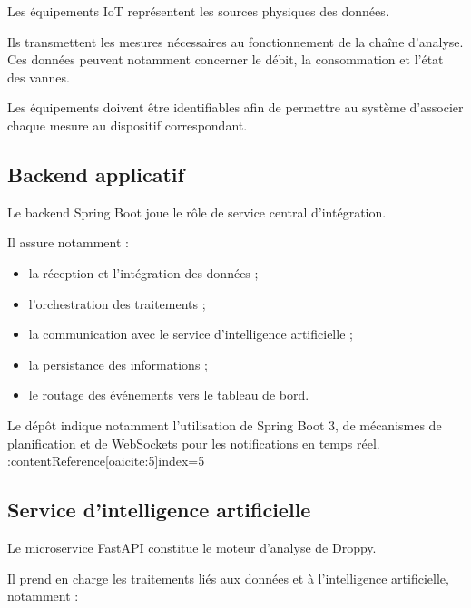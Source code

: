 Les équipements IoT représentent les sources physiques des données.

Ils transmettent les mesures nécessaires au fonctionnement de la chaîne
d'analyse. Ces données peuvent notamment concerner le débit, la
consommation et l'état des vannes.

Les équipements doivent être identifiables afin de permettre au système
d'associer chaque mesure au dispositif correspondant.

\subsection{Backend applicatif}

Le backend Spring Boot joue le rôle de service central d'intégration.

Il assure notamment :

\begin{itemize}

    \item la réception et l'intégration des données ;

    \item l'orchestration des traitements ;

    \item la communication avec le service d'intelligence artificielle ;

    \item la persistance des informations ;

    \item le routage des événements vers le tableau de bord.

\end{itemize}

Le dépôt indique notamment l'utilisation de Spring Boot 3, de mécanismes de
planification et de WebSockets pour les notifications en temps réel. :contentReference[oaicite:5]{index=5}

\subsection{Service d'intelligence artificielle}

Le microservice FastAPI constitue le moteur d'analyse de Droppy.

Il prend en charge les traitements liés aux données et à l'intelligence
artificielle, notamment :

